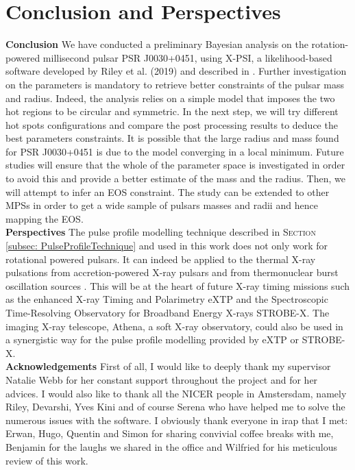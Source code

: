 \documentclass[a4paper, twoside, 12pt]{article}
\numberwithin{equation}{section}
\begin{document}





\newpage
\section*{Conclusion and Perspectives}
{\large{\textbf{Conclusion}}} We have conducted a preliminary Bayesian analysis on the rotation-powered millisecond pulsar PSR J0030+0451, using X-PSI, a likelihood-based software developed by Riley et al. (2019) and described in \cite{Riley+19}. Further investigation on the parameters is mandatory to retrieve better constraints of the pulsar mass and radius. Indeed, the analysis relies on a simple model that imposes the two hot regions to be circular and symmetric. In the next step, we will try different hot spots configurations and compare the post processing results to deduce the best parameters constraints. It is possible that the large radius and mass found for PSR J0030+0451 is due to the model converging in a local minimum. Future studies will ensure that the whole of the parameter space is investigated in order to avoid this and provide a better estimate of the mass and the radius. Then, we will attempt to infer an EOS constraint. 
The study can be extended to other MPSs in order to get a wide sample of pulsars masses and radii and hence mapping the EOS. \\

{\noindent \large{\textbf{Perspectives}} }The pulse profile modelling technique described in S\textsc{ection} \ref{subsec: PulseProfileTechnique} and used in this work does not only work for rotational powered pulsars. It can indeed be applied to the thermal X-ray pulsations from accretion-powered X-ray pulsars and from thermonuclear burst oscillation sources \cite{Watts_PulseProfileModelling}. This will be at the heart of future X-ray timing missions such as the enhanced X-ray Timing and Polarimetry eXTP and  the Spectroscopic Time-Resolving Observatory for Broadband Energy X-rays STROBE-X. The imaging X-ray telescope, Athena, a soft X-ray observatory, could also be used in a synergistic way for the pulse profile modelling provided by eXTP or STROBE-X. \\

{\large{\textbf{Acknowledgements}}}
First of all, I would like to deeply thank my supervisor Natalie Webb for her constant support throughout the project and for her advices. I would also like to thank all the NICER people in Amstersdam, namely Riley, Devarshi, Yves Kini and of course Serena who have helped me to solve the numerous issues with the software. 
I obviously thank everyone in irap that I met: Erwan, Hugo,  Quentin and Simon for sharing convivial coffee breaks with me, Benjamin for the laughs we shared in the office and Wilfried for his meticulous review of this work.\\

\clearpage

\begin{multicols}{2}

\end{multicols}
\end{document}
